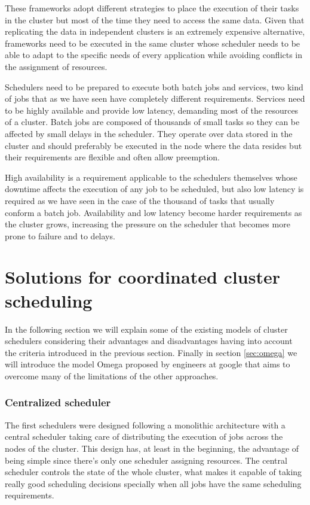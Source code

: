 \documentclass{article}                     %
\begin{document}
These frameworks adopt different strategies to place the
execution of their tasks in the cluster but most of the
time they need to access the same data. Given that replicating the
data in independent clusters is an extremely expensive alternative, frameworks
need to be executed in the same cluster whose scheduler needs to be able to adapt
to the specific needs of every application while avoiding conflicts in
the assignment of resources.

Schedulers need to be prepared to execute both batch jobs and services,
two kind of jobs that as we have seen have completely different
requirements. Services need to be highly available and provide low
latency, demanding most of the resources of a cluster. Batch jobs are
composed of thousands of small tasks so they can be affected by small
delays in the scheduler. They operate over data stored in the cluster
and should preferably be executed in the node where the data resides
but their requirements are flexible and often allow preemption.

High availability is a requirement applicable to the schedulers
themselves whose downtime affects the execution of any job to be
scheduled, but also low latency is required as we have seen in the
case of the thousand of tasks that usually conform a batch
job. Availability and low latency become harder requirements as the
cluster grows, increasing the pressure on the scheduler that becomes
more prone to failure and to delays.

\section{Solutions for coordinated cluster scheduling}

In the following section we will explain some of the existing models
of cluster schedulers considering their advantages and disadvantages
having into account the criteria introduced in the previous
section. Finally in section \ref{sec:omega} we will introduce the
model Omega \cite{41684} proposed by engineers at google that aims to
overcome many of the limitations of the other approaches.

\subsubsection{Centralized scheduler}

The first schedulers were designed following a monolithic architecture
with a central scheduler taking care of distributing the execution
of jobs across the nodes of the cluster. This design has, at least in
the beginning, the advantage of being simple since there's only one
scheduler assigning resources. The central scheduler controls the
state of the whole cluster, what makes it capable of taking really
good scheduling decisions specially when all jobs have the same
scheduling requirements. 
\end{document}
